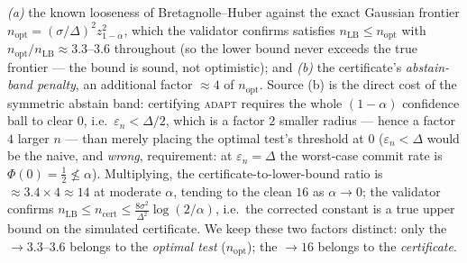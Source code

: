 \begin{remark}
\emph{(a)} the known looseness of Bretagnolle--Huber against the
exact Gaussian frontier $n_{\mathrm{opt}}=(\sigma/\Delta)^2 z_{1-\alpha}^2$, which the validator
confirms satisfies $n_{\mathrm{LB}}\le n_{\mathrm{opt}}$ with
$n_{\mathrm{opt}}/n_{\mathrm{LB}}\approx3.3$--$3.6$ throughout (so the lower bound never exceeds
the true frontier --- the bound is sound, not optimistic); and \emph{(b)} the certificate's
\emph{abstain-band penalty}, an additional factor $\approx4$ of $n_{\mathrm{opt}}$. Source (b) is
the direct cost of the symmetric abstain band: certifying \textsc{adapt} requires the whole
$(1-\alpha)$ confidence ball to clear $0$, i.e.\ $\varepsilon_n<\Delta/2$, which is a factor $2$
smaller radius --- hence a factor $4$ larger $n$ --- than merely placing the optimal test's
threshold at $0$ ($\varepsilon_n<\Delta$ would be the naive, and \emph{wrong}, requirement: at
$\varepsilon_n=\Delta$ the worst-case commit rate is $\Phi(0)=\tfrac12\not\le\alpha$). Multiplying,
the certificate-to-lower-bound ratio is $\approx3.4\times4\approx14$ at moderate $\alpha$, tending to
the clean $16$ as $\alpha\to0$; the validator confirms
$n_{\mathrm{LB}}\le n_{\mathrm{cert}}\le\tfrac{8\sigma^2}{\Delta^2}\log(2/\alpha)$, i.e.\ the
corrected constant is a true upper bound on the simulated certificate. We keep these two factors
distinct: only the $\to3.3$--$3.6$ belongs to the \emph{optimal test} ($n_{\mathrm{opt}}$); the
$\to16$ belongs to the \emph{certificate}.
\end{remark}

